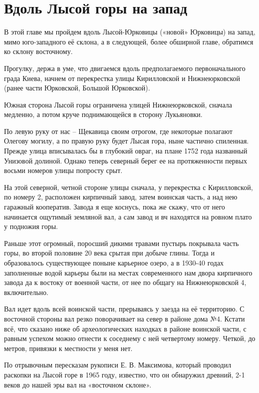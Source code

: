 \chapter{Вдоль Лысой горы на запад}

В этой главе мы пройдем вдоль Лысой-Юрковицы («новой» Юрковицы) на запад, мимо юго-западного её склона, а в следующей, более обширной главе, обратимся ко склону восточному.

Прогулку, держа в уме, что двигаемся вдоль предполагаемого первоначального града Киева, начнем от перекрестка улицы Кирилловской и Нижнеюрковской (ранее части Юрковской, Большой Юрковской).

Южная сторона Лысой горы ограничена улицей Нижнеюрковской, сначала медленно, а потом круче поднимающейся в сторону Лукьяновки.

По левую руку от нас – Щекавица своим отрогом, где некоторые полагают Олегову могилу, а по правую руку будет Лысая гора, ныне частично спиленная. Прежде улица вписывалась бы в глубокий овраг, на плане 1752 года названный Унизовой долиной. Однако теперь северный берег ее на протяженности первых восьми номеров улицы попросту срыт.

На этой северной, четной стороне улицы сначала, у перекрестка с Кирилловской, по номеру 2, расположен кирпичный завод, затем  воинская часть, а над нею гаражный кооператив. Завода я еще коснусь, пока же скажу, что от него начинается ощутимый земляной вал, а сам завод и вч находятся на ровном плато у подножия горы.

Раньше этот огромный, поросший дикими травами пустырь покрывала часть горы, во второй половине 20 века срытая при добыче глины. Тогда и образовалось существующее поныне карьерное озеро, а в 1930-40 годах заполненные водой карьеры были на местах современного нам двора кирпичного завода да к востоку от военной части, от нее по общагу на Нижнеюрковской 4, включительно.

Вал идет вдоль всей воинской части, прерываясь у заезда на её территорию. С восточной стороны вал резко поворачивает на север в районе дома №4. Кстати всё, что сказано ниже об археологических находках в районе воинской части, с равным успехом можно отнести к соседнему с ней четвертому номеру. Четкой, до метров, привязки к местности у меня нет.

По отрывочным пересказам рукописи Е. В. Максимова, который проводил раскопки на Лысой горе в 1965 году, известно, что он обнаружил древний, 2-1 веков до нашей эры вал на «восточном склоне».

